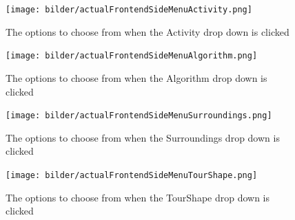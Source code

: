 \begin{figure}[H]
	\texttt{[image: bilder/actualFrontendSideMenuActivity.png]}
	\caption{The options to choose from when the Activity drop down is clicked}
	\label{fig:actualFrontendSideMenuActivity}
\end{figure}


\begin{figure}[H]
	\texttt{[image: bilder/actualFrontendSideMenuAlgorithm.png]}
	\caption{The options to choose from when the Algorithm drop down is clicked}
	\label{fig:actualFrontendSideMenuAlgorithm}
\end{figure}


\begin{figure}[H]
	\texttt{[image: bilder/actualFrontendSideMenuSurroundings.png]}
	\caption{The options to choose from when the Surroundings drop down is clicked}
	\label{fig:actualFrontendSideMenuSurroundings}
\end{figure}


\begin{figure}[H]
	\texttt{[image: bilder/actualFrontendSideMenuTourShape.png]}
	\caption{The options to choose from when the TourShape drop down is clicked}
	\label{fig:actualFrontendSideMenuTourShape}
\end{figure}